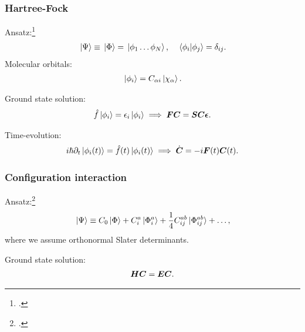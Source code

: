 \documentclass{beamer}
\begin{document}
\begin{frame}
    \frametitle{Hartree-Fock}
    Ansatz:\footcite{szabo1996modern}
    \begin{align}
        \ket*{\Psi} \equiv \ket*{\Phi}
        = \ket*{\phi_1 \dots \phi_N},
        \quad
        \braket*{\phi_i}{\phi_j} = \delta_{ij}.
    \end{align}
    Molecular orbitals:
    \begin{align}
        \ket*{\phi_i} = C_{\alpha i}\ket*{\chi_{\alpha}}.
    \end{align}
\end{frame}

\begin{frame}
    Ground state solution:
    \begin{gather}
        \hat{f}\ket*{\phi_i} = \epsilon_i\ket*{\phi_i}
        \implies
        \boldsymbol{F}\boldsymbol{C}
        = \boldsymbol{S}\boldsymbol{C}\boldsymbol{\epsilon}.
    \end{gather}
\end{frame}

\begin{frame}
    Time-evolution:
    \begin{gather}
        i\hslash\partial_t\ket*{\phi_i(t)}
        = \hat{f}(t)\ket*{\phi_i(t)}
        \implies
        \dot{\boldsymbol{C}} = -i\boldsymbol{F}(t)\boldsymbol{C}(t).
    \end{gather}
\end{frame}

\begin{frame}
    \frametitle{Configuration interaction}
    Ansatz:\footcite{helgaker-molecular}
    \begin{align}
        \ket*{\Psi} \equiv C_0\ket*{\Phi}
        + C^{a}_{i}\ket*{\Phi^{a}_{i}}
        + \frac{1}{4}C^{ab}_{ij}\ket*{\Phi^{ab}_{ij}}
        + \dots,
    \end{align}
    where we assume orthonormal Slater determinants.
\end{frame}

\begin{frame}
    Ground state solution:
    \begin{align}
        \boldsymbol{H}\boldsymbol{C} = \boldsymbol{E}\boldsymbol{C}.
    \end{align}
\end{frame}
\end{document}
